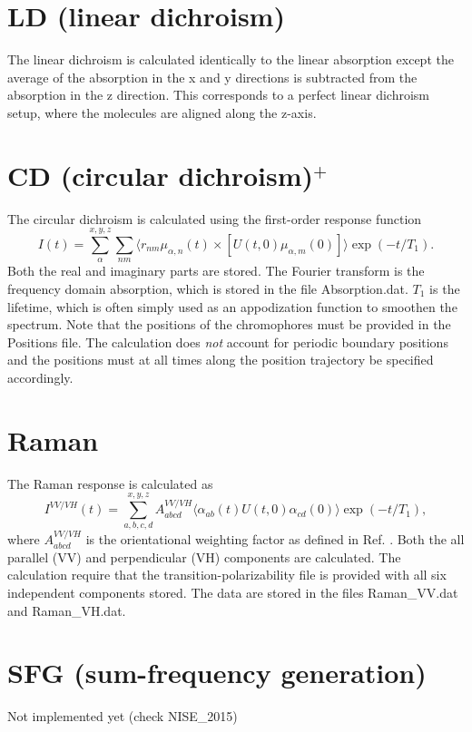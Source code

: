 \section{LD (linear dichroism)}
The linear dichroism is calculated identically to the linear absorption except the average of the absorption in the x and y directions is subtracted from the absorption in the z direction. This corresponds to a perfect linear dichroism setup, where the molecules are aligned along the z-axis.
\section{CD (circular dichroism)$^{+}$}
The circular dichroism is calculated using the first-order response function
\begin{equation}
	I(t)=\sum_{\alpha}^{x,y,z}\sum_{nm}\langle r_{nm}\mu_{\alpha,n}(t)\times[U(t,0)\mu_{\alpha,m}(0)]\rangle\exp(-t/T_1).
\end{equation}
Both the real and imaginary parts are stored. The Fourier transform is the frequency domain absorption, which is stored in the file Absorption.dat. $T_1$ is the lifetime, which is often simply used as an appodization function to smoothen the spectrum. Note that the positions of the chromophores must be provided in the Positions file. The calculation does \textit{not} account for periodic boundary positions and the positions must at all times along the position trajectory be specified accordingly.
\section{Raman}
The Raman response is calculated as \cite{Torii.2002.J.Phys.Chem.A.106.3281,Shi.2012.J.Phys.Chem.B.116.13821}
\begin{equation}
        I^{VV/VH}(t)=\sum_{a,b,c,d}^{x,y,z}A^{VV/VH}_{abcd}\langle\alpha_{ab}(t)U(t,0)\alpha_{cd}(0)\rangle\exp(-t/T_1),
\end{equation}
where $A^{VV/VH}_{abcd}$ is the orientational weighting factor as defined in Ref. . 
Both the all parallel (VV) and perpendicular (VH) components are calculated. The calculation require that the transition-polarizability file is provided with all six independent components stored. The data are stored in the files Raman\_VV.dat and Raman\_VH.dat.
\section{SFG (sum-frequency generation)}
Not implemented yet (check NISE\_2015)

